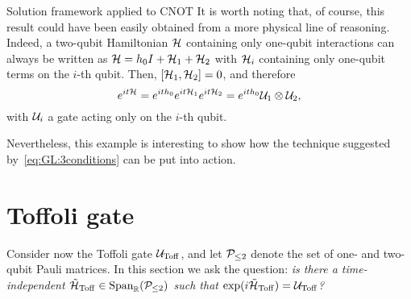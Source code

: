 \begin{examplebox}[label={ex:GL:cnot_with_conditions}]{Solution framework applied to CNOT}
It is worth noting that, of course, this result could have been easily obtained from a more physical line of reasoning. Indeed, a two-qubit Hamiltonian ${\mathcal{H}}$ containing only one-qubit interactions can always be written as ${\mathcal{H}}=h_0 I+{\mathcal{H}}_1+{\mathcal{H}}_2$ with ${\mathcal{H}}_i$ containing only one-qubit terms on the $i$-th qubit. Then, $[{\mathcal{H}}_1,{\mathcal{H}}_2]=0$, and therefore
\begin{equation}
    e^{it{\mathcal{H}}}=e^{it h_0}e^{it{\mathcal{H}}_1}e^{it{\mathcal{H}}_2}=e^{it h_0} {\mathcal{U}}_1\otimes{\mathcal{U}}_2,
\end{equation}
with ${\mathcal{U}}_i$ a gate acting only on the $i$-th qubit.

Nevertheless, this example is interesting to show how the technique suggested by~\cref{eq:GL:3conditions} can be put into action.
\end{examplebox}

\section{Toffoli gate}
\label{sec:GL:toffoli}

Consider now the Toffoli gate ${\mathcal{U}}_{\operatorname{Toff}}$, and let ${\mathcal{P}}_{\le2}$ denote the set of one- and two-qubit Pauli matrices. In this section we ask the question: \emph{is there a time-independent $\tilde{{\mathcal{H}}}_{\operatorname{Toff}}\in\operatorname{Span}_{\mathbb{R}}({\mathcal{P}}_{\le2})$ such that $\exponential(i\HTildeToff)=\UToff$?}

